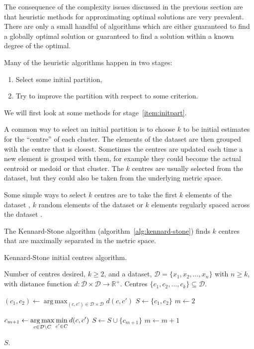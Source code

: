 \documentclass[a4paper]{report}
\DeclareMathOperator*{\argmax}{arg\,max}
\newcommand{\dset}{\mathcal{D}}
\begin{document}
The consequence of the complexity issues discussed in the previous section are
that heuristic methods for approximating optimal solutions are very
prevalent.  There are only a small handful of algorithms which are either
guaranteed to find a globally optimal solution or guaranteed to find a
solution within a known degree of the optimal.

Many of the heuristic algorithms happen in two stages:
\begin{enumerate}
\item \label{item:initpart} Select some initial partition,
\item \label{item:improvepart} Try to improve the partition with respect to
  some criterion.
\end{enumerate}
We will first look at some methods for stage~\ref{item:initpart}.

A common way to select an initial partition is to choose $k$ to be initial
estimates for the ``centre'' of each cluster.  The elements of the dataset are
then grouped with the centre that is closest.  Sometimes the centres are
updated each time a new element is grouped with them, for example they could
become the actual centroid or medoid or that cluster.  The $k$ centres are
usually selected from the dataset, but they could also be taken from the
underlying metric space.

Some simple ways to select $k$ centres are to take the first $k$ elements of
the dataset \citep{macqueen1967some}, $k$ random elements of the dataset
\citep{forgy65cluster} or $k$ elements regularly spaced across the dataset
\citep{beale1969euclidean}.

The Kennard-Stone algorithm (algorithm~\ref{alg:kennard-stone}) finds $k$
centres that are maximally separated in the metric space.

\begin{algorithm}
  \caption{Kennard-Stone initial centres algorithm.}
  \label{alg:kennard-stone}

  \begin{algorithmic}
    \Require Number of centres desired, $k \geq 2$, and a dataset, $\dset =
             \{x_1,x_2,\dotsc,x_n\}$ with $n \geq k$, with distance function
             $d \colon \dset \times \dset \to \mathbb{R}^+$.
    \Ensure Centres $\{c_1,c_2,\dotsc,c_k\} \subseteq \dset$.

    \State $\displaystyle (c_1,c_2) \gets
            \argmax_{(c,c') \in \dset \times \dset} d(c,c')$
    \State $S \gets \{c_1,c_2\}$
    \State $m \gets 2$

       \State $\displaystyle c_{m+1} \gets
               \argmax_{c \in \dset \setminus C}
               \min_{\raisebox{-.2em}{$\scriptstyle c' \in C$}} d(c,c')$
       \State $S \gets S \cup \{c_{m+1}\}$
       \State $m \gets m+1$
    \EndWhile

    \State \Return $S$.
  \end{algorithmic}
\end{algorithm}
\end{document}
